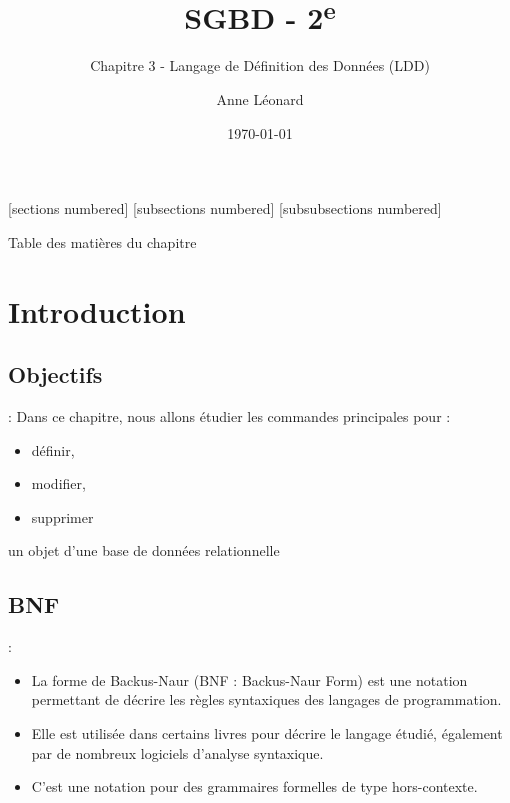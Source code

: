 \documentclass[10pt]{beamer}
\title{SGBD - 2\textsuperscript{e}}
\subtitle{Chapitre 3 - Langage de Définition des Données (LDD)}
\date{\today}
\author{Anne Léonard}
\institute{Haute École de la Province de Liège}
\begin{document}
\maketitle

[sections numbered]
[subsections numbered]
[subsubsections numbered]
\begin{frame}[allowframebreaks]{Table des matières du chapitre}
    \tableofcontents[subsectionstyle=show/show/hide,subsubsectionstyle=show/show/hide,]
\end{frame}

\section{Introduction}
\tocss
\subsection{Objectifs}
\begin{frame}{\secname : \subsecname}
    Dans ce chapitre, nous allons étudier les commandes principales pour :

    \begin{itemize}
        \item définir,
        \item modifier,
        \item supprimer
    \end{itemize}
    un objet d’une base de données relationnelle
\end{frame}

\subsection{BNF}
\begin{frame}{\secname : \subsecname}
    \begin{itemize}
        \item La forme de Backus-Naur (BNF : Backus-Naur Form) est une notation permettant de décrire les règles syntaxiques des langages de programmation.
        \item Elle est utilisée dans certains livres pour décrire le langage étudié, également par de nombreux logiciels d'analyse syntaxique.
        \item C'est une notation pour des grammaires formelles de type hors-contexte.
    \end{itemize}
\end{frame}
\end{document}
